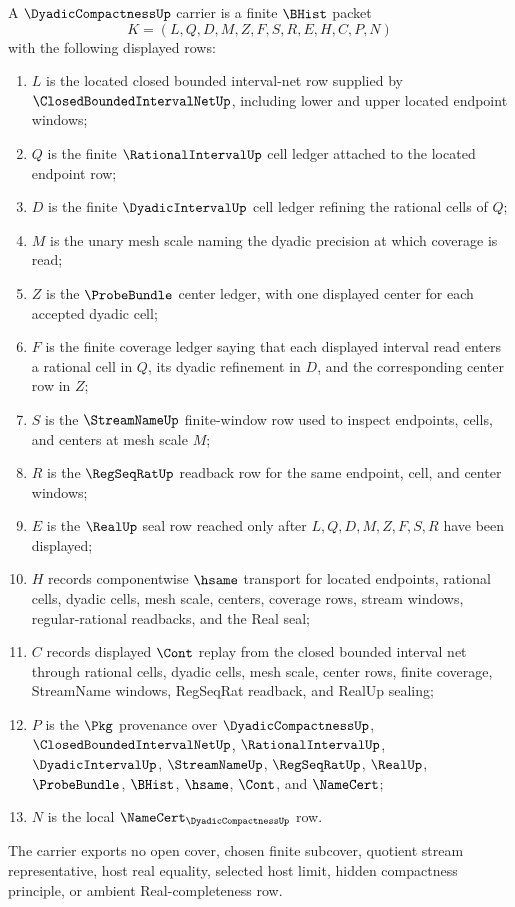 \begin{definition}
\label{def:dyadic-compactness-carrier}
A $\DyadicCompactnessUp$ carrier is a finite $\BHist$ packet
$$
K=(L,Q,D,M,Z,F,S,R,E,H,C,P,N)
$$
with the following displayed rows:
\begin{enumerate}
\item $L$ is the located closed bounded interval-net row supplied by $\ClosedBoundedIntervalNetUp$, including lower and upper located endpoint windows;
\item $Q$ is the finite $\RationalIntervalUp$ cell ledger attached to the located endpoint row;
\item $D$ is the finite $\DyadicIntervalUp$ cell ledger refining the rational cells of $Q$;
\item $M$ is the unary mesh scale naming the dyadic precision at which coverage is read;
\item $Z$ is the $\ProbeBundle$ center ledger, with one displayed center for each accepted dyadic cell;
\item $F$ is the finite coverage ledger saying that each displayed interval read enters a rational cell in $Q$, its dyadic refinement in $D$, and the corresponding center row in $Z$;
\item $S$ is the $\StreamNameUp$ finite-window row used to inspect endpoints, cells, and centers at mesh scale $M$;
\item $R$ is the $\RegSeqRatUp$ readback row for the same endpoint, cell, and center windows;
\item $E$ is the $\RealUp$ seal row reached only after $L,Q,D,M,Z,F,S,R$ have been displayed;
\item $H$ records componentwise $\hsame$ transport for located endpoints, rational cells, dyadic cells, mesh scale, centers, coverage rows, stream windows, regular-rational readbacks, and the Real seal;
\item $C$ records displayed $\Cont$ replay from the closed bounded interval net through rational cells, dyadic cells, mesh scale, center rows, finite coverage, StreamName windows, RegSeqRat readback, and RealUp sealing;
\item $P$ is the $\Pkg$ provenance over $\DyadicCompactnessUp$, $\ClosedBoundedIntervalNetUp$, $\RationalIntervalUp$, $\DyadicIntervalUp$, $\StreamNameUp$, $\RegSeqRatUp$, $\RealUp$, $\ProbeBundle$, $\BHist$, $\hsame$, $\Cont$, and $\NameCert$;
\item $N$ is the local $\NameCert_{\DyadicCompactnessUp}$ row.
\end{enumerate}
The carrier exports no open cover, chosen finite subcover, quotient stream representative, host real equality, selected host limit, hidden compactness principle, or ambient Real-completeness row.
\end{definition}


